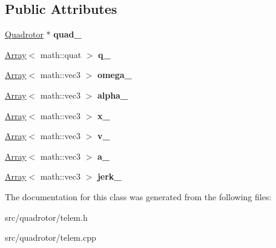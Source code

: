 \subsection*{\-Public \-Attributes}
\begin{DoxyCompactItemize}
\item 
\hypertarget{classTelem_a56091fc88e4c6bfe0c9781e2e8be8e44}{\hyperlink{classQuadrotor}{\-Quadrotor} $\ast$ {\bfseries quad\-\_\-}}\label{classTelem_a56091fc88e4c6bfe0c9781e2e8be8e44}

\item 
\hypertarget{classTelem_abdb9ed3d409e996b74909784bf9fd61d}{\hyperlink{classArray}{\-Array}$<$ math\-::quat $>$ {\bfseries q\-\_\-}}\label{classTelem_abdb9ed3d409e996b74909784bf9fd61d}

\item 
\hypertarget{classTelem_a0861519483511babb47b0ffdde4cecf4}{\hyperlink{classArray}{\-Array}$<$ math\-::vec3 $>$ {\bfseries omega\-\_\-}}\label{classTelem_a0861519483511babb47b0ffdde4cecf4}

\item 
\hypertarget{classTelem_a8bb4ed4b578a7a6d90af8e843fe7f907}{\hyperlink{classArray}{\-Array}$<$ math\-::vec3 $>$ {\bfseries alpha\-\_\-}}\label{classTelem_a8bb4ed4b578a7a6d90af8e843fe7f907}

\item 
\hypertarget{classTelem_a59de229401e2fdb33774a18205a3cf71}{\hyperlink{classArray}{\-Array}$<$ math\-::vec3 $>$ {\bfseries x\-\_\-}}\label{classTelem_a59de229401e2fdb33774a18205a3cf71}

\item 
\hypertarget{classTelem_a5767a4b818b4e74f7bccd0bdd7dabf08}{\hyperlink{classArray}{\-Array}$<$ math\-::vec3 $>$ {\bfseries v\-\_\-}}\label{classTelem_a5767a4b818b4e74f7bccd0bdd7dabf08}

\item 
\hypertarget{classTelem_a49f429c0ed1160d4daf2ba6b55b22369}{\hyperlink{classArray}{\-Array}$<$ math\-::vec3 $>$ {\bfseries a\-\_\-}}\label{classTelem_a49f429c0ed1160d4daf2ba6b55b22369}

\item 
\hypertarget{classTelem_ac62fe1671c28ce28b74deb8e94b27c05}{\hyperlink{classArray}{\-Array}$<$ math\-::vec3 $>$ {\bfseries jerk\-\_\-}}\label{classTelem_ac62fe1671c28ce28b74deb8e94b27c05}

\end{DoxyCompactItemize}


\-The documentation for this class was generated from the following files\-:\begin{DoxyCompactItemize}
\item 
src/quadrotor/telem.\-h\item 
src/quadrotor/telem.\-cpp\end{DoxyCompactItemize}
